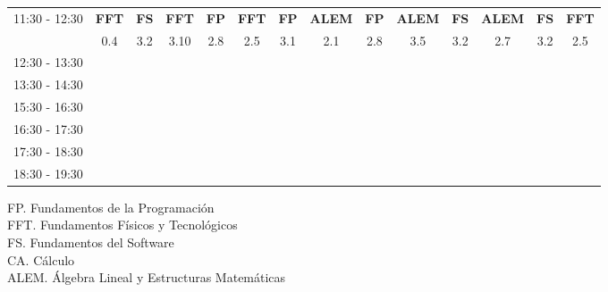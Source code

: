 \documentclass[10pt,spanish, landscape]{article}
\begin{document}
\begin{minipage}{0.7\textwidth}
\begin{tabular}{|c|ccc|ccc|ccc|ccc|ccc|}
 \hline
\multirow{2}{*}{11:30 - 12:30} & \multicolumn{3}{|c|}{ \cellcolor{grisclaro} \textbf{FFT}} & \textbf{FS} & \textbf{FFT} & \textbf{FP} & \textbf{FFT} & \textbf{FP} & \textbf{ALEM} & \textbf{FP} & \textbf{ALEM} & \textbf{FS} & \textbf{ALEM} & \textbf{FS} & \textbf{FFT}\\ 
& \multicolumn{3}{|c|}{ \cellcolor{grisclaro} {\footnotesize 0.4}} & {\footnotesize 3.2} & {\footnotesize 3.10} & {\footnotesize 2.8} & {\footnotesize 2.5} & {\footnotesize 3.1} & {\footnotesize 2.1} & {\footnotesize 2.8} & {\footnotesize 3.5} & {\footnotesize 3.2} & {\footnotesize 2.7} & {\footnotesize 3.2} & {\footnotesize 2.5}\\ 
 \hline
\multirow{2}{*}{12:30 - 13:30}  &  &  &  &  &  &  &  &  &  &  &  &  &  &  & \\ 
 &  &  &  &  &  &  &  &  &  &  &  &  &  &  & \\ 
 \hline
\multirow{2}{*}{13:30 - 14:30}  &  &  &  &  &  &  &  &  &  &  &  &  &  &  & \\ 
 &  &  &  &  &  &  &  &  &  &  &  &  &  &  & \\ 
 \hline
\multirow{2}{*}{15:30 - 16:30}  &  &  &  &  &  &  &  &  &  &  &  &  &  &  & \\ 
 &  &  &  &  &  &  &  &  &  &  &  &  &  &  & \\ 
 \hline
\multirow{2}{*}{16:30 - 17:30}  &  &  &  &  &  &  &  &  &  &  &  &  &  &  & \\ 
 &  &  &  &  &  &  &  &  &  &  &  &  &  &  & \\ 
 \hline
\multirow{2}{*}{17:30 - 18:30}  &  &  &  &  &  &  &  &  &  &  &  &  &  &  & \\ 
 &  &  &  &  &  &  &  &  &  &  &  &  &  &  & \\ 
 \hline
\multirow{2}{*}{18:30 - 19:30}  &  &  &  &  &  &  &  &  &  &  &  &  &  &  & \\ 
 &  &  &  &  &  &  &  &  &  &  &  &  &  &  & \\ 
 \hline

\end{tabular}
\end{minipage}
\begin{minipage}{0.25\textwidth}
FP. Fundamentos de la Programación\\[0.5cm]
FFT. Fundamentos Físicos y Tecnológicos\\[0.5cm]
FS. Fundamentos del Software\\[0.5cm]
CA. Cálculo\\[0.5cm]
ALEM. Álgebra Lineal y Estructuras Matemáticas\\[0.5cm]
\end{minipage}
\newpage
\end{document}
